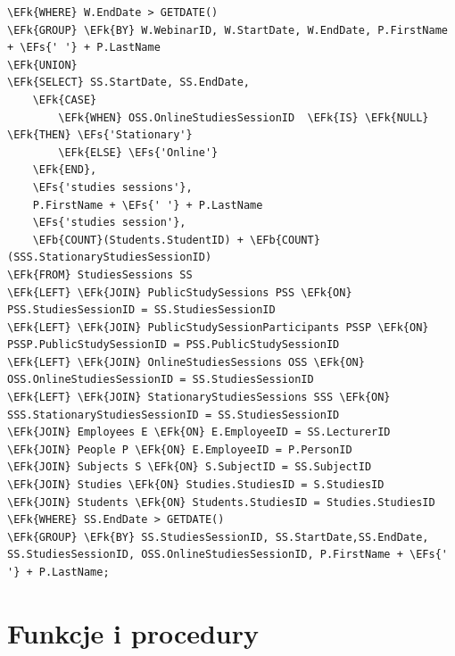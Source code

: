 \documentclass[11pt]{article}
\newcommand{\EFs}[1]{\textcolor{EFs}{#1}} %
\newcommand{\EFk}[1]{\textcolor{EFk}{\textbf{#1}}} %
\newcommand{\EFb}[1]{\textcolor{EFb}{\textbf{#1}}} %
\begin{document}
\begin{Code}
\begin{Verbatim}
\EFk{WHERE} W.EndDate > GETDATE()
\EFk{GROUP} \EFk{BY} W.WebinarID, W.StartDate, W.EndDate, P.FirstName + \EFs{' '} + P.LastName
\EFk{UNION}
\EFk{SELECT} SS.StartDate, SS.EndDate,  
    \EFk{CASE}
        \EFk{WHEN} OSS.OnlineStudiesSessionID  \EFk{IS} \EFk{NULL} \EFk{THEN} \EFs{'Stationary'}
        \EFk{ELSE} \EFs{'Online'}
    \EFk{END},
    \EFs{'studies sessions'},
    P.FirstName + \EFs{' '} + P.LastName
    \EFs{'studies session'},
    \EFb{COUNT}(Students.StudentID) + \EFb{COUNT}(SSS.StationaryStudiesSessionID)
\EFk{FROM} StudiesSessions SS
\EFk{LEFT} \EFk{JOIN} PublicStudySessions PSS \EFk{ON} PSS.StudiesSessionID = SS.StudiesSessionID
\EFk{LEFT} \EFk{JOIN} PublicStudySessionParticipants PSSP \EFk{ON} PSSP.PublicStudySessionID = PSS.PublicStudySessionID
\EFk{LEFT} \EFk{JOIN} OnlineStudiesSessions OSS \EFk{ON} OSS.OnlineStudiesSessionID = SS.StudiesSessionID
\EFk{LEFT} \EFk{JOIN} StationaryStudiesSessions SSS \EFk{ON} SSS.StationaryStudiesSessionID = SS.StudiesSessionID
\EFk{JOIN} Employees E \EFk{ON} E.EmployeeID = SS.LecturerID
\EFk{JOIN} People P \EFk{ON} E.EmployeeID = P.PersonID
\EFk{JOIN} Subjects S \EFk{ON} S.SubjectID = SS.SubjectID
\EFk{JOIN} Studies \EFk{ON} Studies.StudiesID = S.StudiesID
\EFk{JOIN} Students \EFk{ON} Students.StudiesID = Studies.StudiesID 
\EFk{WHERE} SS.EndDate > GETDATE()
\EFk{GROUP} \EFk{BY} SS.StudiesSessionID, SS.StartDate,SS.EndDate, SS.StudiesSessionID, OSS.OnlineStudiesSessionID, P.FirstName + \EFs{' '} + P.LastName;
\end{Verbatim}
\end{Code}
\section{Funkcje i procedury}
\label{sec:org95342f2}
\end{document}

